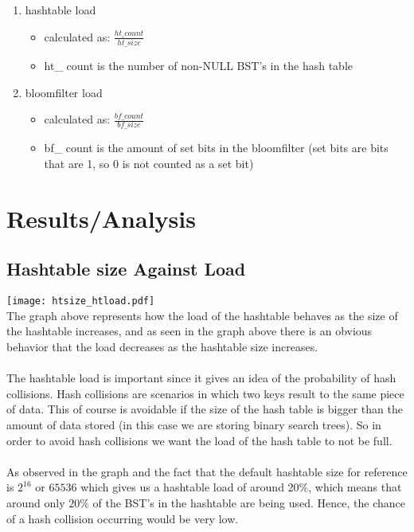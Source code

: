 \documentclass[
	12pt, %
]{fphw}
\begin{document}
\begin{enumerate}
	\item hashtable load
	\begin{itemize}
		\item calculated as: $\frac{ht\_ count}{ht\_ size}$
		\item ht\_ count is the number of non-NULL BST's in the hash table
	\end{itemize}
	
	\item bloomfilter load
	\begin{itemize}
		\item calculated as: $\frac{bf\_ count}{bf\_ size}$
		\item bf\_ count is the amount of set bits in the bloomfilter (set bits are bits that are 1, so 0 is not counted as a set bit)
	\end{itemize}
	
\end{enumerate}


\section{Results/Analysis}

%
%	
%	
%	

\subsection{Hashtable size Against Load}

\texttt{[image: htsize\_htload.pdf]}
\\
The graph above represents how the load of the hashtable behaves as the size of the hashtable increases, and as seen in the graph above there is an obvious behavior that the load decreases as the hashtable size increases. \\
\\
The hashtable load is important since it gives an idea of the probability of hash collisions. Hash collisions are scenarios in which two keys result to the same piece of data. This of course is avoidable if the size of the hash table is bigger than the amount of data stored (in this case we are storing binary search trees). So in order to avoid hash collisions we want the load of the hash table to not be full. \\
\\
As observed in the graph and the fact that the default hashtable size for reference is $2^{16}$ or $65536$ which gives us a hashtable load of around 20\%, which means that around only $20\%$ of the BST's in the hashtable are being used. Hence, the chance of a hash collision occurring would be very low.
\end{document}
